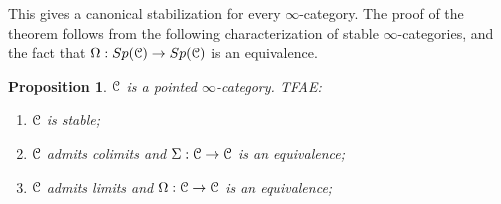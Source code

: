 \documentclass[10pt,a4paper,reqno,oneside]{book} %
\theoremstyle{plain}
\newtheorem{thm}{Theorem}[section]
\newtheorem{prop}[thm]{Proposition}
\theoremstyle{definition}
\theoremstyle{remark}
\numberwithin{equation}{section}
\begin{document}
This gives a canonical stabilization for every $\infty$-category. The proof of the theorem follows from the following characterization
of stable $\infty$-categories,
and the fact that $\Omega:Sp(\mathcal C) \to Sp(\mathcal C)$ is an equivalence.

\begin{prop}
\label{prop:stable_shift}
$\mathcal C$ is a pointed $\infty$-category. TFAE:
\begin{enumerate}
\item $\mathcal C$ is stable;
\item $\mathcal C$ admits colimits and $\Sigma : \mathcal C \to \mathcal C$ is an equivalence;
\item $\mathcal C$ admits limits and $\Omega : \mathcal C \to \mathcal C$ is an equivalence;
\end{enumerate}
\end{prop}








\end{document}
